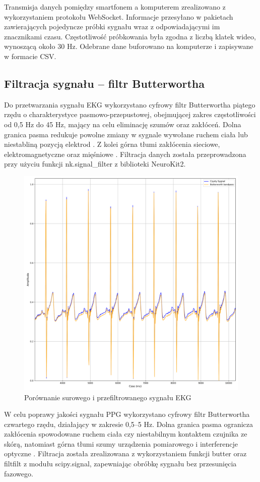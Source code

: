 \documentclass[journal]{IEEEtran}
\begin{document}
Transmisja danych pomiędzy smartfonem a komputerem zrealizowano z wykorzystaniem protokołu WebSocket. Informacje przesyłano w pakietach zawierających pojedyncze próbki sygnału wraz z odpowiadającymi im znacznikami czasu. Częstotliwość próbkowania była zgodna z liczbą klatek wideo, wynoszącą około 30 Hz. Odebrane dane buforowano na komputerze i zapisywane w formacie CSV.

\subsection{Filtracja sygnału – filtr Butterwortha}
Do przetwarzania sygnału EKG wykorzystano cyfrowy filtr Butterwortha piątego rzędu o charakterystyce pasmowo-przepustowej, obejmującej zakres częstotliwości od 0,5 Hz do 45 Hz, mający na celu eliminację szumów oraz zakłóceń. Dolna granica pasma redukuje powolne zmiany w sygnale wywołane ruchem ciała lub niestabliną pozycją elektrod  \cite{7}. Z kolei górna tłumi zakłócenia sieciowe, elektromagnetyczne oraz mięśniowe  \cite{8}. Filtracja danych została przeprowadzona przy użyciu funkcji nk.signal\_filter z biblioteki NeuroKit2.

\begin{figure}[htbp]
    \centering
    \includegraphics[width=0.76\linewidth]{Filtr_EKG.png} 
    \caption{Porównanie surowego i przefiltrowanego sygnału EKG}
    \label{fig:filtr_ekg}
\end{figure}

W celu poprawy jakości sygnału PPG wykorzystano cyfrowy filtr Butterwortha czwartego rzędu, działający w zakresie 0,5–5 Hz. Dolna granica pasma ogranicza zakłócenia spowodowane ruchem ciała czy niestabilnym kontaktem czujnika ze skórą, natomiast górna tłumi szumy urządzenia pomiarowego i interferencje optyczne  \cite{9}. Filtracja została zrealizowana z wykorzystaniem funkcji butter oraz filtfilt z modułu scipy.signal, zapewniając obróbkę sygnału bez przesunięcia fazowego.
\end{document}
